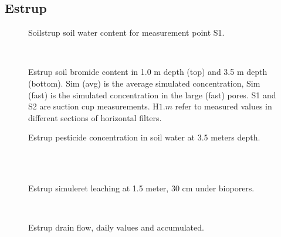 \subsection*{Estrup}

\begin{figure}[htbp]
  \begin{center}
  \end{center}
  \caption{Soilstrup soil water content for measurement point S1.}
  \label{fig:Estrup-theta}
\end{figure}\FloatBarrier

\begin{figure}[htbp]
  \begin{center}
    \\
  \end{center}
  \caption{Estrup soil bromide content in 1.0 m depth (top) and 3.5
    m depth (bottom).  Sim (avg) is the average simulated
    concentration, Sim (fast) is the simulated concentration in the
    large (fast) pores.  S1 and S2 are suction cup measurements.
    H$1$.$m$ refer to measured values in different sections of
    horizontal filters.}
  \label{fig:Estrup-bromide}
\end{figure}\FloatBarrier


\begin{figure}[htbp]
  \begin{center}
  \end{center}
  \caption{Estrup pesticide concentration in soil water at 3.5 meters
    depth.}
  \label{fig:Estrup-horizontal}
\end{figure}\FloatBarrier

\begin{figure}[htbp]
  \begin{center}
    \\
    \\
  \end{center}
  \caption{Estrup simuleret leaching at 1.5 meter, 30 cm under bioporers.}
  \label{fig:Estrup-leak150}
\end{figure}\FloatBarrier

\begin{figure}[htbp]
  \begin{center}
    \\
  \end{center}
  \caption{Estrup drain flow, daily values and accumulated.}
  \label{fig:Estrup-drain}
\end{figure}\FloatBarrier

